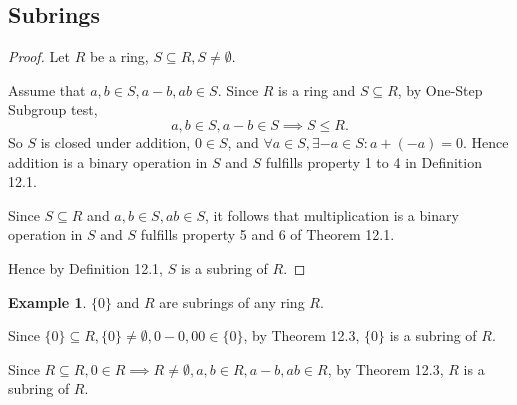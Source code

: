 \documentclass{article}
\newtheorem{theorem}{Theorem}[section]
\theoremstyle{definition}
\newtheorem{definition}{Definition}[section]
\newtheorem{example}{Example}[section]
\begin{document}
    \subsection{Subrings}
    
    \noindent{}
    
    \begin{proof}
        Let $R$ be a ring, $S\subseteq R, S\neq \emptyset$. 
        
        Assume that $a,b \in S, a-b,ab \in S$. Since $R$ is a ring and $S \subseteq R$, by One-Step Subgroup test,
        \begin{equation*}
            a,b \in S, a-b\in S \implies S \leq R.
        \end{equation*}
        So $S$ is closed under addition, $0 \in S$, and $\forall a \in S, \exists -a \in S: a+(-a)=0$. Hence addition is a binary operation in $S$ and $S$ fulfills property 1 to 4 in Definition 12.1.
        
        Since $S \subseteq R$ and $a,b \in S, ab \in S$, it follows that multiplication is a binary operation in $S$ and $S$ fulfills property 5 and 6 of Theorem 12.1.
        
        Hence by Definition 12.1, $S$ is a subring of $R$.
    \end{proof}
    
    \begin{example}
        $\{0\}$ and $R$ are subrings of any ring $R$. 
        
        Since $\{0\}\subseteq R, \{0\}\neq\emptyset, 0-0,00 \in \{0\}$, by Theorem 12.3, $\{0\}$ is a subring of $R$.
        
        Since $R \subseteq R, 0 \in R \implies R \neq\emptyset, a,b \in R, a-b,ab \in R$, by Theorem 12.3, $R$ is a subring of $R$.
    \end{example}
    
\end{document}
